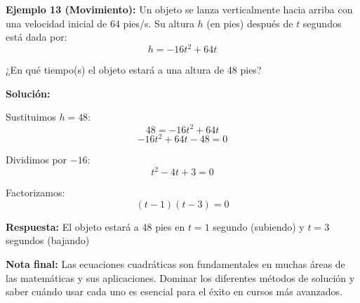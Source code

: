 \begin{example}
\textbf{Ejemplo 13 (Movimiento):} Un objeto se lanza verticalmente hacia arriba con una velocidad inicial de 64 pies/s. Su altura $h$ (en pies) después de $t$ segundos está dada por:
$$h = -16t^2 + 64t$$

¿En qué tiempo(s) el objeto estará a una altura de 48 pies?

\textbf{Solución:}

Sustituimos $h = 48$:
$$48 = -16t^2 + 64t$$
$$-16t^2 + 64t - 48 = 0$$

Dividimos por $-16$:
$$t^2 - 4t + 3 = 0$$

Factorizamos:
$$(t - 1)(t - 3) = 0$$

\textbf{Respuesta:} El objeto estará a 48 pies en $t = 1$ segundo (subiendo) y $t = 3$ segundos (bajando)
\end{example}

\textbf{Nota final:} Las ecuaciones cuadráticas son fundamentales en muchas áreas de las matemáticas y sus aplicaciones. Dominar los diferentes métodos de solución y saber cuándo usar cada uno es esencial para el éxito en cursos más avanzados.
